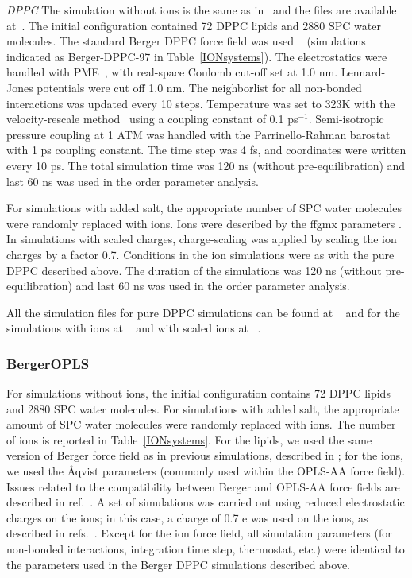 \documentclass[pre,aps,floatfix,authordate1-4,twocolumn]{revtex4-1}
\begin{document}
{\it DPPC} The simulation without ions is the same as in~\cite{botan15} and the files are available at~\cite{bergerDPPCfiles}.
The initial configuration contained 72 DPPC lipids and 2880 SPC water molecules.
The standard Berger DPPC force field was used ~\cite{berger97} (simulations indicated as Berger-DPPC-97 in Table~\ref{IONsystems}). 
The electrostatics were handled with PME~\cite{darden93,essman95}, with real-space Coulomb cut-off set at 1.0 nm. Lennard-Jones potentials were cut off 1.0 nm. The neighborlist for all non-bonded interactions was updated every 10 steps. 
Temperature was set to 323K with the velocity-rescale method~\cite{bussi07} using a coupling constant of 0.1 ps$^{-1}$.  Semi-isotropic pressure coupling at 1 ATM was handled with the Parrinello-Rahman barostat~\cite{parrinello81} with 1 ps coupling constant. The time step was 4 fs, and coordinates were written every 10 ps. The total simulation time was 120 ns (without pre-equilibration) and last 60 ns was used in the order parameter analysis. 

For simulations with added salt, the appropriate number of SPC water molecules were randomly replaced with ions. Ions were described by the ffgmx parameters \cite{straatsma88}. In simulations with scaled charges, charge-scaling was applied by scaling the ion charges  by a factor 0.7. Conditions in the ion simulations were as with the pure DPPC described above. The duration of the simulations was 120 ns (without pre-equilibration) and last 60 ns was used in the order parameter analysis.

All the simulation files for pure DPPC simulations can be found at ~\cite{bergerDPPCfiles} and for the simulations with ions at 
~\cite{bergerDPPC150mMfiles, bergerDPPC1000mMfiles} 
and with scaled ions at ~\cite{DPPCBergerNaCl150mMscaled, DPPCBergerNaCl1000mMscaled}.



\subsubsection{BergerOPLS}
For simulations without ions, the initial configuration contains 72 DPPC lipids and 2880 SPC water molecules. For simulations with added salt, the appropriate amount of SPC water molecules were randomly replaced with ions. The number of ions is reported in Table~\ref{IONsystems}.
For the lipids, we used the same version of Berger force field as in previous simulations, described in \cite{berger97}; for the ions, we used the Åqvist parameters \cite{aqvist90} (commonly used within the OPLS-AA force field). Issues related to the compatibility between Berger and OPLS-AA force fields are described in ref.~\cite{tieleman06}. 
A set of simulations was carried out using reduced electrostatic charges on the ions; in this case, a charge of 0.7 e was used on the ions, as described in refs.~\cite{kohagen16, leontyev11}. Except for the ion force field, all simulation parameters (for non-bonded interactions, integration time step, thermostat, etc.) were identical to the parameters used in the Berger DPPC simulations described above.
\end{document}
